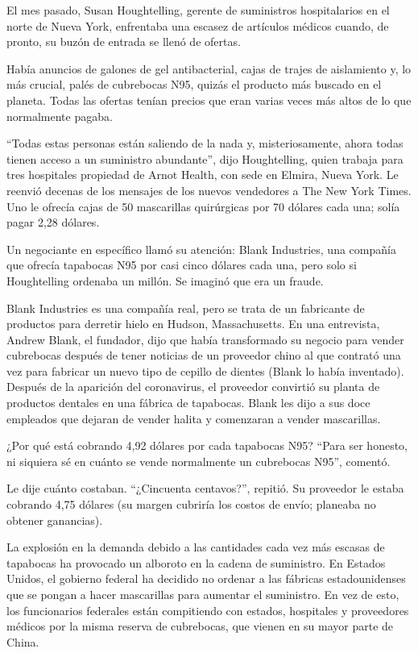 El mes pasado, Susan Houghtelling, gerente de suministros hospitalarios
en el norte de Nueva York, enfrentaba una escasez de artículos médicos
cuando, de pronto, su buzón de entrada se llenó de ofertas.

Había anuncios de galones de gel antibacterial, cajas de trajes de
aislamiento y, lo más crucial, palés de cubrebocas N95, quizás el
producto más buscado en el planeta. Todas las ofertas tenían precios que
eran varias veces más altos de lo que normalmente pagaba.

``Todas estas personas están saliendo de la nada y, misteriosamente,
ahora todas tienen acceso a un suministro abundante'', dijo
Houghtelling, quien trabaja para tres hospitales propiedad de Arnot
Health, con sede en Elmira, Nueva York. Le reenvió decenas de los
mensajes de los nuevos vendedores a The New York Times. Uno le ofrecía
cajas de 50 mascarillas quirúrgicas por 70 dólares cada una; solía pagar
2,28 dólares.

Un negociante en específico llamó su atención: Blank Industries, una
compañía que ofrecía tapabocas N95 por casi cinco dólares cada una, pero
solo si Houghtelling ordenaba un millón. Se imaginó que era un fraude.

Blank Industries es una compañía real, pero se trata de un fabricante de
productos para derretir hielo en Hudson, Massachusetts. En una
entrevista, Andrew Blank, el fundador, dijo que había transformado su
negocio para vender cubrebocas después de tener noticias de un proveedor
chino al que contrató una vez para fabricar un nuevo tipo de cepillo de
dientes (Blank lo había inventado). Después de la aparición del
coronavirus, el proveedor convirtió su planta de productos dentales en
una fábrica de tapabocas. Blank les dijo a sus doce empleados que
dejaran de vender halita y comenzaran a vender mascarillas.

¿Por qué está cobrando 4,92 dólares por cada tapabocas N95? ``Para ser
honesto, ni siquiera sé en cuánto se vende normalmente un cubrebocas
N95'', comentó.

Le dije cuánto costaban. ``¿Cincuenta centavos?'', repitió. Su proveedor
le estaba cobrando 4,75 dólares (su margen cubriría los costos de envío;
planeaba no obtener ganancias).

La explosión en la demanda debido a las cantidades cada vez más escasas
de tapabocas ha provocado un alboroto en la cadena de suministro. En
Estados Unidos, el gobierno federal ha decidido no ordenar a las
fábricas estadounidenses que se pongan a hacer mascarillas para aumentar
el suministro. En vez de esto, los funcionarios federales están
compitiendo con estados, hospitales y proveedores médicos por la misma
reserva de cubrebocas, que vienen en su mayor parte de China.

